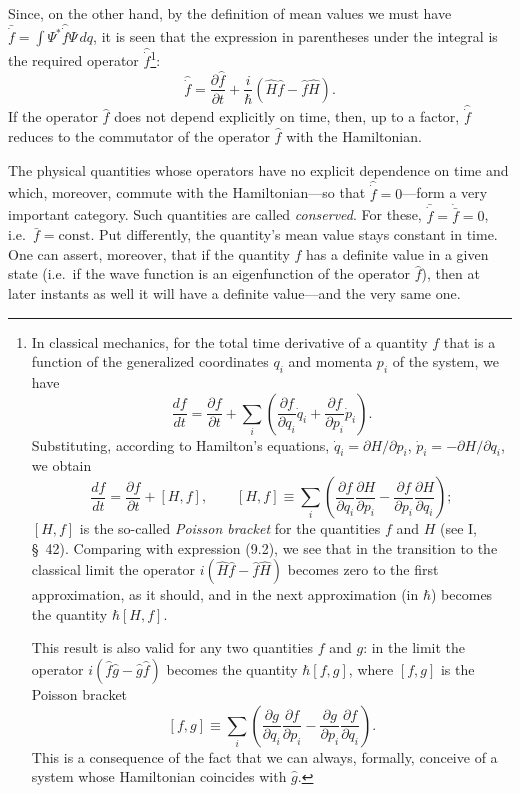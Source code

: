 Since, on the other hand, by the definition of mean values we must have
$\bar{\dot f}=\int\Psi^*\hat{\dot f}\Psi\,dq$, it is seen that the
expression in parentheses under the integral is the required operator
$\hat{\dot f}$\footnote{In classical mechanics, for the total time
derivative of a quantity $f$ that is a function of the generalized coordinates
$q_i$ and momenta $p_i$ of the system, we have
\[
  \frac{df}{dt}=\frac{\partial f}{\partial t}
  +\sum_i\left(
    \frac{\partial f}{\partial q_i}\dot q_i
    +\frac{\partial f}{\partial p_i}\dot p_i
  \right).
\]
Substituting, according to Hamilton's equations,
$\dot q_i=\partial H/\partial p_i$, $\dot p_i=-\partial H/\partial q_i$, we
obtain
\[
  \frac{df}{dt}=\frac{\partial f}{\partial t}+[H,f],\qquad
  [H,f]\equiv\sum_i\left(
    \frac{\partial f}{\partial q_i}\frac{\partial H}{\partial p_i}
    -\frac{\partial f}{\partial p_i}\frac{\partial H}{\partial q_i}
  \right);
\]
$[H,f]$ is the so-called \textit{Poisson bracket} for the quantities $f$ and
$H$ (see I, \S~42). Comparing with expression (9.2), we see that in the
transition to the classical limit the operator
$i(\hat H\hat f-\hat f\hat H)$ becomes zero to the first approximation, as it
should, and in the next approximation (in $\hbar$) becomes the quantity
$\hbar[H,f]$.

This result is also valid for any two quantities $f$ and $g$: in the limit the
operator $i(\hat f\hat g-\hat g\hat f)$ becomes the quantity $\hbar[f,g]$,
where $[f,g]$ is the Poisson bracket
\[
  [f,g]\equiv\sum_i\left(
    \frac{\partial g}{\partial q_i}\frac{\partial f}{\partial p_i}
    -\frac{\partial g}{\partial p_i}\frac{\partial f}{\partial q_i}
  \right).
\]
This is a consequence of the fact that we can always, formally, conceive of a
system whose Hamiltonian coincides with $\hat g$.}:
\begin{equation}
  \hat{\dot f}
  =\frac{\partial\hat f}{\partial t}
  +\frac{i}{\hbar}(\hat H\hat f-\hat f\hat H).
  \tag{9.2}
\end{equation}
If the operator $\hat f$ does not depend explicitly on time, then, up to a
factor, $\hat{\dot f}$ reduces to the commutator of the operator $\hat f$
with the Hamiltonian.

The physical quantities whose operators have no explicit dependence on time
and which, moreover, commute with the Hamiltonian---so that
$\hat{\dot f}=0$---form a very important category. Such quantities are called
\textit{conserved}. For these,
$\bar{\dot f}=\dot{\bar f}=0$, i.e.\ $\bar f=\mathrm{const}$. Put
differently, the quantity's mean value stays constant in time. One can
assert, moreover, that if the quantity $f$ has a definite value in a given
state (i.e.\ if the wave function is an eigenfunction of the operator
$\hat f$), then at later instants as well it will have a definite value---and
the very same one.
